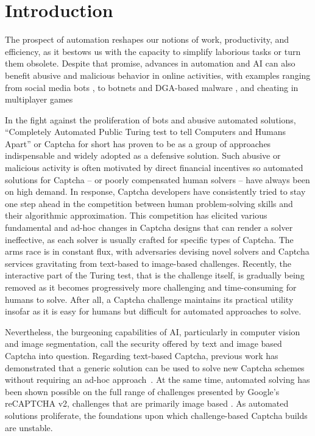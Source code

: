 \section{Introduction}
The prospect of automation reshapes our notions of work, productivity, and efficiency, as it bestows us with the capacity to simplify laborious tasks or turn them obsolete.
Despite that promise, advances in automation and AI can also benefit abusive and malicious behavior in online activities, with examples ranging from social media bots \cite{chu2012detecting}, to botnets and DGA-based malware \cite{antonakakis2012throw}, and cheating in multiplayer games \cite{chow2010captcha}

In the fight against the proliferation of bots and abusive automated solutions, ``Completely Automated Public Turing test to tell Computers and Humans Apart'' or Captcha for short has proven to be as a group of approaches \cite{xu2020survey} indispensable and widely adopted as a defensive solution.
Such abusive or malicious activity is often motivated by direct financial incentives so automated solutions for Captcha -- or poorly compensated human solvers -- have always been on high demand.
In response, Captcha developers have consistently tried to stay one step ahead in the competition between human problem-solving skills and their algorithmic approximation.
This competition has elicited various fundamental and ad-hoc changes in Captcha designs that can render a solver ineffective, as each solver is usually crafted for specific types of Captcha.
The arms race is in constant flux, with adversaries devising novel solvers and Captcha services gravitating from text-based to image-based challenges.
Recently, the interactive part of the Turing test, that is the challenge itself, is gradually being removed as it becomes progressively more challenging and time-consuming for humans to solve.
After all, a Captcha challenge maintains its practical utility insofar as it is easy for humans but difficult for automated approaches to solve.

Nevertheless, the burgeoning capabilities of AI, particularly in computer vision and image segmentation, call the security offered by text and image based Captcha into question.
Regarding text-based Captcha, previous work has demonstrated that a generic solution can be used to solve new Captcha schemes without requiring an ad-hoc approach~\cite{bursztein2014end}.
At the same time, automated solving has been shown possible on the full range of challenges presented by Google's reCAPTCHA v2, challenges that are primarily image based \cite{sivakorn2016robot}.
As automated solutions proliferate, the foundations upon which challenge-based Captcha builds are unstable.

